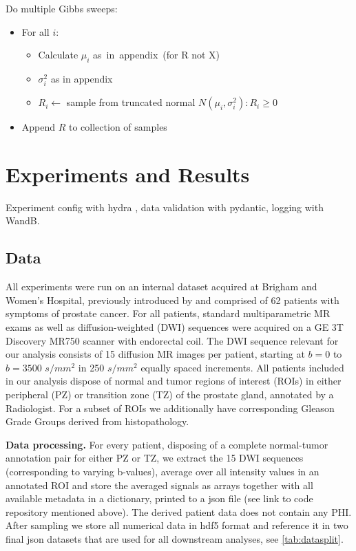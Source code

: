 \documentclass{article}
\begin{document}
Do multiple Gibbs sweeps:
\begin{itemize}
  \item For all $i$:
  \begin{itemize}
    \item Calculate $\mu_i$ \mbox{as in appendix (for} R \mbox{not} X)
    \item $\sigma^2_i$ as in appendix
    \item $R_i \leftarrow$ sample from truncated normal $N(\mu_i, \sigma^2_i) : R_i \geq 0$
  \end{itemize}
  \item Append $R$ to collection of samples
\end{itemize}

\section{Experiments and Results}

Experiment config with hydra \cite{Yadan2019Hydra}, data validation with pydantic, logging with WandB.

\subsection{Data}

All experiments were run on an internal dataset acquired at Brigham and Women's Hospital, previously introduced by \cite{langkilde2018evaluation} and comprised of 62 patients with symptoms of prostate cancer. For all patients, standard multiparametric MR exams as well as diffusion-weighted (DWI) sequences were acquired on a GE 3T Discovery MR750 scanner with endorectal coil. The DWI sequence relevant for our analysis consists of 15 diffusion MR images per patient, starting at $b=0$ to $b=3500$ $s/{mm^2}$ in 250 $s/{mm^2}$ equally spaced increments. All patients included in our analysis dispose of normal and tumor regions of interest (ROIs) in either peripheral (PZ) or transition zone (TZ) of the prostate gland, annotated by a Radiologist. For a subset of ROIs we additionally have corresponding Gleason Grade Groups derived from histopathology.

\textbf{Data processing.} For every patient, disposing of a complete normal-tumor annotation pair for either PZ or TZ, we extract the 15 DWI sequences (corresponding to varying b-values), average over all intensity values in an annotated ROI and store the averaged signals as arrays together with all available metadata in a dictionary, printed to a json file (see link to code repository mentioned above). The derived patient data does not contain any PHI. After sampling we store all numerical data in hdf5 format and reference it in two final json datasets that are used for all downstream analyses, see \ref{tab:datasplit}.
\end{document}
